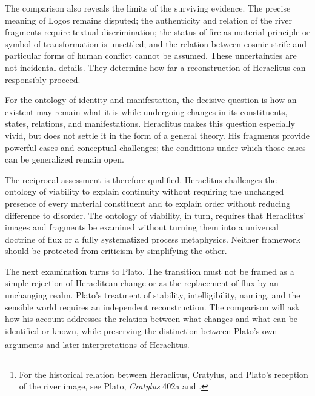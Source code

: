 \label{para:VS.B01.P01.C08.S03.SS10.P002}

The comparison also reveals the limits of
the surviving evidence. The precise meaning
of Logos remains disputed; the authenticity
and relation of the river fragments require
textual discrimination; the status of fire
as material principle or symbol of transformation
is unsettled; and the relation between cosmic
strife and particular forms of human conflict
cannot be assumed. These uncertainties are
not incidental details. They determine how
far a reconstruction of Heraclitus can
responsibly proceed.

\label{para:VS.B01.P01.C08.S03.SS10.P003}

For the ontology of identity and manifestation,
the decisive question is how an existent may
remain what it is while undergoing changes
in its constituents, states, relations, and
manifestations. Heraclitus makes this question
especially vivid, but does not settle it in
the form of a general theory. His fragments
provide powerful cases and conceptual
challenges; the conditions under which those
cases can be generalized remain open.

\label{para:VS.B01.P01.C08.S03.SS10.P004}

The reciprocal assessment is therefore
qualified. Heraclitus challenges the ontology
of viability to explain continuity without
requiring the unchanged presence of every
material constituent and to explain order
without reducing difference to disorder.
The ontology of viability, in turn, requires
that Heraclitus' images and fragments be
examined without turning them into a
universal doctrine of flux or a fully
systematized process metaphysics. Neither
framework should be protected from criticism
by simplifying the other.

\label{para:VS.B01.P01.C08.S03.SS10.P005}

The next examination turns to Plato.
The transition must not be framed as a
simple rejection of Heraclitean change
or as the replacement of flux by an
unchanging realm. Plato's treatment of
stability, intelligibility, naming, and
the sensible world requires an independent
reconstruction. The comparison will ask
how his account addresses the relation
between what changes and what can be
identified or known, while preserving
the distinction between Plato's own
arguments and later interpretations
of Heraclitus.\footnote{For the historical
relation between Heraclitus, Cratylus,
and Plato's reception of the river image,
see Plato, \textit{Cratylus} 402a and
\cite{PlatoCratylus,GrahamHeraclitusSEP2023}.}

